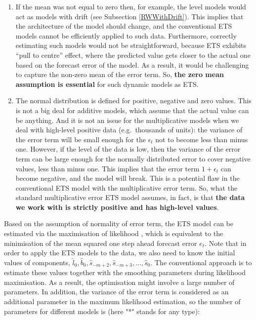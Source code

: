 \documentclass[]{book}
\providecommand{\tightlist}{%
  \setlength{\itemsep}{0pt}\setlength{\parskip}{0pt}}
\theoremstyle{definition}
\theoremstyle{definition}
\theoremstyle{definition}
\theoremstyle{definition}
\theoremstyle{remark}
\begin{document}
\begin{enumerate}
\def\labelenumi{\arabic{enumi}.}
\tightlist
\item
  If the mean was not equal to zero then, for example, the level models would act as models with drift (see Subsection \ref{RWWithDrift}). This implies that the architecture of the model should change, and the conventional ETS models cannot be efficiently applied to such data. Furthermore, correctly estimating such models would not be straightforward, because ETS exhibits ``pull to centre'' effect, where the predicted value gets closer to the actual one based on the forecast error of the model. As a result, it would be challenging to capture the non-zero mean of the error term. So, \textbf{the zero mean assumption is essential} for such dynamic models as ETS.
\item
  The normal distribution is defined for positive, negative and zero values. This is not a big deal for additive models, which assume that the actual value can be anything. And it is not an issue for the multiplicative models when we deal with high-level positive data (e.g.~thousands of units): the variance of the error term will be small enough for the \(\epsilon_t\) not to become less than minus one. However, if the level of the data is low, then the variance of the error term can be large enough for the normally distributed error to cover negative values, less than minus one. This implies that the error term \(1+\epsilon_t\) can become negative, and the model will break. This is a potential flaw in the conventional ETS model with the multiplicative error term. So, what the standard multiplicative error ETS model assumes, in fact, is that \textbf{the data we work with is strictly positive and has high-level values}.
\end{enumerate}

Based on the assumption of normality of error term, the ETS model can be estimated via the maximisation of likelihood \citep[see Chapter 13 of][]{SvetunkovSBA}, which is equivalent to the minimisation of the mean squared one step ahead forecast error \(e_t\). Note that in order to apply the ETS models to the data, we also need to know the initial values of components, \(\hat{l}_0, \hat{b}_0, \hat{s}_{-m+2}, \hat{s}_{-m+3}, \dots, \hat{s}_{0}\). The conventional approach is to estimate these values together with the smoothing parameters during likelihood maximisation. As a result, the optimisation might involve a large number of parameters. In addition, the variance of the error term is considered as an additional parameter in the maximum likelihood estimation, so the number of parameters for different models is (here "*" stands for any type):
\end{document}
